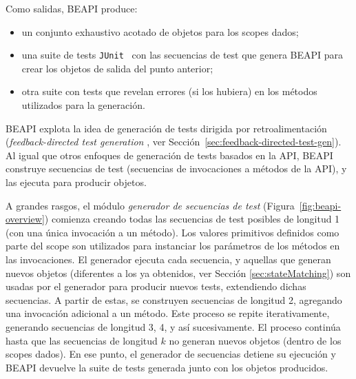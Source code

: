 Como salidas, \textsf{BEAPI} produce:
\begin{itemize}
    \item un conjunto exhaustivo acotado de objetos para los scopes dados;
    \item una suite de tests \texttt{JUnit}~\cite{junit} con las secuencias de test 
        que genera \textsf{BEAPI} para crear los objetos de salida del punto anterior;
    \item otra suite con tests que revelan errores (si los hubiera) en los métodos utilizados 
        para la generación.
\end{itemize}

\textsf{BEAPI} explota la idea de generación de tests dirigida por retroalimentación 
(\emph{feedback-directed test generation} \cite{Pacheco07,PaPacheco08}, ver Sección~\ref{sec:feedback-directed-test-gen}). 
Al igual que otros enfoques de generación de tests basados en la API, 
\textsf{BEAPI} construye secuencias de test \cite{Pacheco07,PaPacheco08}(secuencias de invocaciones a
métodos de la API), y las ejecuta para producir objetos.


A grandes rasgos, el módulo \emph{generador de secuencias de test} (Figura~\ref{fig:beapi-overview}) 
comienza creando todas las secuencias de test posibles de longitud 1 (con una
única invocación a un método). Los valores primitivos definidos como parte del
scope son utilizados para instanciar los parámetros de los métodos en las
invocaciones.
El generador ejecuta cada secuencia, y aquellas que generan nuevos objetos (diferentes 
a los ya obtenidos, ver Sección \ref{sec:stateMatching}) son usadas por
el generador para producir nuevos tests, extendiendo dichas secuencias. A partir
de estas, se construyen secuencias de longitud 2, agregando una invocación
adicional a un método. 
Este proceso se repite iterativamente, generando secuencias de longitud 3, 4, y así sucesivamente.
El proceso continúa hasta que las secuencias de longitud $k$ no generan nuevos 
objetos (dentro de los scopes dados).
En ese punto, el generador de secuencias detiene su ejecución y BEAPI devuelve
la suite de tests generada junto con los objetos producidos.

